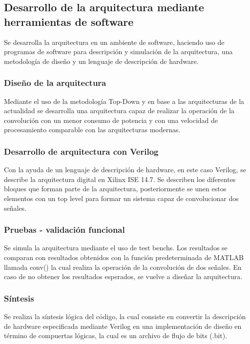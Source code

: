 \subsection{Desarrollo de la arquitectura mediante herramientas de software}
Se desarrolla la arquitectura en un ambiente de software, haciendo uso de programas de software para descripción y simulación de la arquitectura, una metodología de diseño y un lenguaje de descripción de hardware. 

\subsubsection{Diseño de la arquitectura}
Mediante el uso de la metodología Top-Down y en base a las arquitecturas de la actualidad se desarrolla una arquitectura capaz de realizar la operación de la convolución con un menor consumo de potencia y con una velocidad de procesamiento comparable con las arquitecturas modernas.  

\subsubsection{Desarrollo de arquitectura con Verilog}
Con la ayuda de un lenguaje de descripción de hardware, en este caso Verilog, se describe la arquitectura digital en Xilinx ISE 14.7. Se describen los diferentes bloques que forman parte de la arquitectura, posteriormente se unen estos elementos con un top level para formar un sistema capaz de convolucionar dos señales.

\subsubsection{Pruebas - validación funcional}
Se simula la arquitectura mediante el uso de test benchs. Los resultados se comparan con resultados obtenidos con la función predeterminada de MATLAB llamada conv() la cual realiza la operación de la convolución de dos señales. En caso de no obtener los resultados esperados, se vuelve a diseñar la arquitectura. 

\subsubsection{Síntesis}
Se realiza la síntesis lógica del código, la cual consiste en convertir la descripción de hardware especificada mediante Verilog en una implementación de diseño en término de compuertas lógicas, la cual es un archivo de flujo de bits (.bit).  

